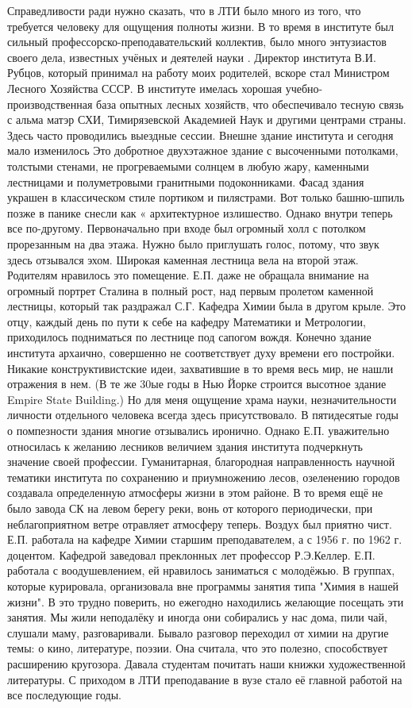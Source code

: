 Справедливости ради нужно сказать, что в ЛТИ было много из того, что требуется человеку для ощущения полноты жизни. В то время в институте был сильный профессорско-преподавательский коллектив, было много энтузиастов своего дела, известных учёных и деятелей науки . Директор института В.И. Рубцов, который принимал на работу моих родителей, вскоре стал Министром Лесного Хозяйства СССР. В институте имелась хорошая учебно-производственная база опытных лесных хозяйств, что обеспечивало тесную связь с альма матэр СХИ, Тимирязевской Академией Наук и другими центрами страны. Здесь часто проводились выездные сессии.
Внешне здание института и сегодня мало изменилось Это добротное двухэтажное здание с высоченными потолками, толстыми стенами, не прогреваемыми солнцем в любую жару, каменными лестницами и полуметровыми гранитными подоконниками. Фасад здания украшен в классическом стиле портиком и пилястрами. Вот только башню-шпиль позже в панике снесли как « архитектурное излишество. Однако внутри теперь все по-другому. Первоначально при входе был огромный холл с потолком прорезанным на два этажа. Нужно было приглушать голос, потому, что звук здесь отзывался эхом. Широкая каменная лестница вела на второй этаж. Родителям нравилось это помещение. Е.П. даже не обращала внимание на огромный портрет Сталина в полный рост, над первым пролетом каменной лестницы, который так раздражал С.Г. Кафедра Химии была в другом крыле. Это отцу, каждый день по пути к себе на кафедру Математики и Метрологии, приходилось подниматься по лестнице под сапогом вождя. Конечно здание института архаично, совершенно не соответствует духу времени его постройки. Никакие конструктивистские идеи, захватившие в то время весь мир, не нашли отражения в нем. (В те же 30ые годы в Нью Йорке строится высотное здание Empire State Building.) Но для меня ощущение храма науки, незначительности личности отдельного человека всегда здесь присутствовало. В пятидесятые годы о помпезности здания многие отзывались иронично. Однако Е.П. уважительно относилась к желанию лесников величием здания института подчеркнуть значение своей профессии. Гуманитарная, благородная направленность научной тематики института по сохранению и приумножению лесов, озеленению городов создавала определенную атмосферы жизни в этом районе. В то время ещё не было завода СК на левом берегу реки, вонь от которого периодически, при неблагоприятном ветре отравляет атмосферу теперь. Воздух был приятно чист.
Е.П. работала на кафедре Химии старшим преподавателем, а с 1956 г. по 1962 г. доцентом. Кафедрой заведовал преклонных лет профессор Р.Э.Келлер. Е.П. работала с воодушевлением, ей нравилось заниматься с молодёжью. В группах, которые курировала, организовала вне программы занятия типа "Химия в нашей жизни". В это трудно поверить, но ежегодно находились желающие посещать эти занятия. Мы жили неподалёку и иногда они собирались у нас дома, пили чай, слушали маму, разговаривали. Бывало разговор переходил от химии на другие темы: о кино, литературе, поэзии. Она считала, что это полезно, способствует расширению кругозора. Давала студентам почитать наши книжки художественной литературы. С приходом в ЛТИ преподавание в вузе стало её главной работой на все последующие годы.
